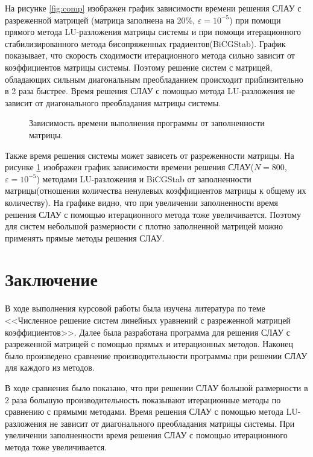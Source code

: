 \documentclass[a4paper, fontsize=14pt]{article}
\begin{document}
На рисунке \ref{fig:comp} изображен график зависимости времени решения СЛАУ с разреженной матрицей
(матрица заполнена на 20\%, $\varepsilon = 10^{-5}$) при помощи прямого метода LU-разложения
матрицы системы и при помощи итерационного стабилизированного метода бисопряженных
градиентов(BiCGStab). График показывает, что скорость
сходимости итерационного метода сильно зависит от коэффициентов матрицы системы. Поэтому решение
систем с матрицей, обладающих сильным диагональным преобладанием происходит приблизительно в 2 раза
быстрее. Время решения СЛАУ с помощью метода LU-разложения не зависит от диагонального преобладания
матрицы системы. 

\begin{figure}[H]
    \scriptsize
    \centering
    
    \caption{Зависимость времени выполнения программы от заполненности матрицы.}
    \label{fig:fill}
\end{figure}
Также время решения системы может зависеть от разреженности матрицы. На рисунке \ref{fig:fill}
изображен график зависимости времени решения СЛАУ($N=800$, $\varepsilon = 10^{-5}$) методами LU-разложения и BiCGStab от заполненности
матрицы(отношения количества ненулевых коэффициентов матрицы к общему их количеству). На графике
видно, что при увеличении заполненности время решения СЛАУ с помощью итерационного метода тоже
увеличивается. Поэтому для систем небольшой размерности с плотно заполненной матрицей можно
применять прямые методы решения СЛАУ.

\newpage

\section*{Заключение}
В ходе выполнения курсовой работы была изучена литература по теме <<Численное решение систем
линейных уравнений с разреженной матрицей коэффициентов>>. 
Далее была разработана программа для решения СЛАУ с разреженной матрицей с помощью прямых и
итерационных методов.  Наконец было произведено сравнение производительности программы при
решении СЛАУ для каждого из методов. 

В ходе сравнения было показано, что при решении СЛАУ большой
размерности в 2 раза большую производительность показывают итерационные методы по сравнению с прямыми
методами. Время решения СЛАУ с помощью метода LU-разложения не зависит
от диагонального преобладания матрицы системы. 
При увеличении заполненности время решения СЛАУ с помощью итерационного метода тоже
увеличивается.
\end{document}
